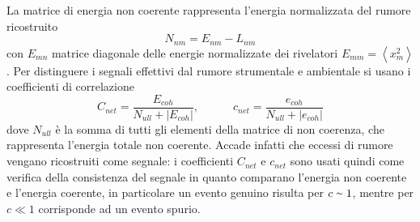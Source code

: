 La matrice di energia non coerente rappresenta l'energia normalizzata del rumore ricostruito
\begin{equation}
	N_{nm} = E_{nm}-L_{nm}
\end{equation}
con $E_{mn}$  matrice diagonale delle energie normalizzate dei rivelatori $E_{mm}  = \left<x_m^2\right>$. Per distinguere i segnali effettivi dal rumore strumentale e ambientale si usano i coefficienti di correlazione 
\begin{equation}
	C_{net} = \frac{E_{coh}}{N_{ull}+|E_{coh}|}, \quad\quad\quad c_{net} = \frac{e_{coh}}{N_{ull}+|e_{coh}|}
	\label{eqn:coefficient_energy}
\end{equation}
dove $N_{ull}$ è la somma di tutti gli elementi della matrice di non coerenza, che rappresenta l'energia totale non coerente. Accade infatti che eccessi di rumore vengano ricostruiti come segnale: i coefficienti $C_{net}$ e $c_{net}$ sono usati quindi come verifica della consistenza del segnale in quanto comparano l'energia non coerente e l'energia coerente\cite{Klimenko_2008}, in particolare un evento genuino risulta per $c\smallsim 1$, mentre per $c \ll 1$ corrisponde ad un evento spurio\cite{Klimenko_2016}.